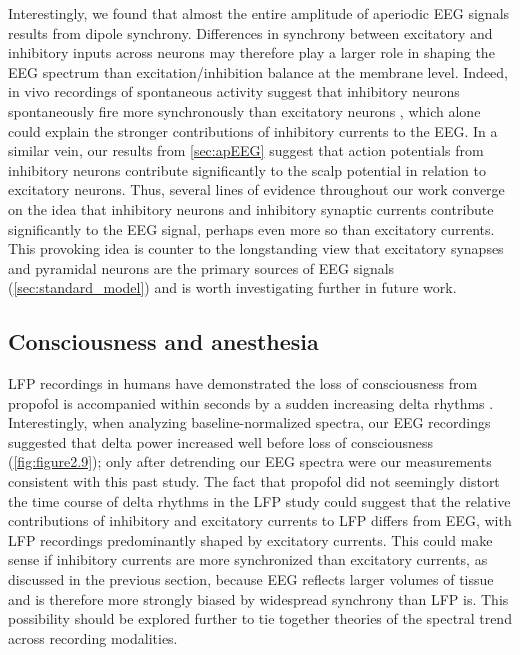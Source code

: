 Interestingly, we found that almost the entire amplitude of aperiodic EEG signals results from dipole synchrony. Differences in synchrony between excitatory and inhibitory inputs across neurons may therefore play a larger role in shaping the EEG spectrum than excitation/inhibition balance at the membrane level. Indeed, in vivo recordings of spontaneous activity suggest that inhibitory neurons spontaneously fire more synchronously than excitatory neurons \cite{Gentet2010}, which alone could explain the stronger contributions of inhibitory currents to the EEG. In a similar vein, our results from \autoref{sec:apEEG} suggest that action potentials from inhibitory neurons contribute significantly to the scalp potential in relation to excitatory neurons. Thus, several lines of evidence throughout our work converge on the idea that inhibitory neurons and inhibitory synaptic currents contribute significantly to the EEG signal, perhaps even more so than excitatory currents. This provoking idea is counter to the longstanding view that excitatory synapses and pyramidal neurons are the primary sources of EEG signals (\autoref{sec:standard_model}) and is worth investigating further in future work. 

\subsection{Consciousness and anesthesia}
LFP recordings in humans have demonstrated the loss of consciousness from propofol is accompanied within seconds by a sudden increasing delta rhythms \cite{Lewis2012}. Interestingly, when analyzing baseline-normalized spectra, our EEG recordings suggested that delta power increased well before loss of consciousness (\autoref{fig:figure2.9}); only after detrending our EEG spectra were our measurements consistent with this past study. The fact that propofol did not seemingly distort the time course of delta rhythms in the LFP study \cite{Lewis2012} could suggest that the relative contributions of inhibitory and excitatory currents to LFP differs from EEG, with LFP recordings predominantly shaped by excitatory currents. This could make sense if inhibitory currents are more synchronized than excitatory currents, as discussed in the previous section, because EEG reflects larger volumes of tissue and is therefore more strongly biased by widespread synchrony than LFP is. This possibility should be explored further to tie together theories of the spectral trend across recording modalities. 

